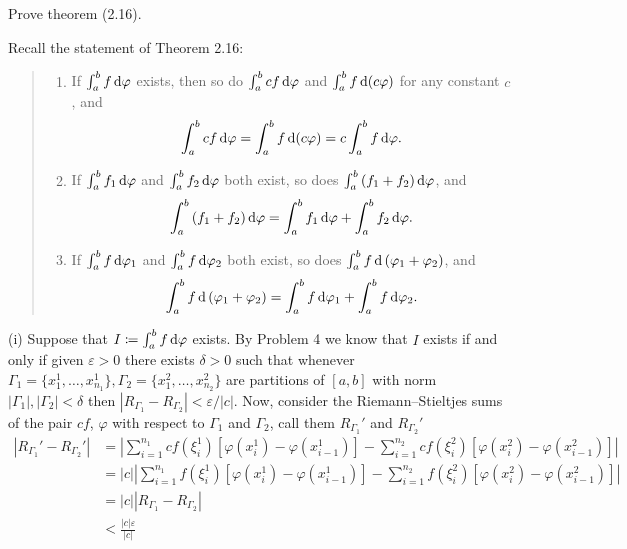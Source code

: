 \begin{problem}
  Prove theorem (2.16).
\end{problem}
\begin{solution}
  Recall the statement of Theorem 2.16:
  \begin{quote}
    \begin{enumerate}[label=(\roman*),noitemsep]
    \item If $\int_a^b f\mathop{}\!\mathrm{d}\varphi$ exists, then so do
      $\int_a^bcf\mathop{}\!\mathrm{d}\varphi$ and $\int_a^b f\mathop{}\!\mathrm{d}(c\varphi)$ for any
      constant $c$, and
      \[
        \int_a^bcf\mathop{}\!\mathrm{d}\varphi=\int_a^bf\mathop{}\!\mathrm{d}(c\varphi)=c\int_a^bf\mathop{}\!\mathrm{d}\varphi.
      \]
    \item If $\int_a^b f_1\mathop{}\!\mathrm{d}\varphi$ and $\int_a^bf_2\mathop{}\!\mathrm{d}\varphi$ both
      exist, so does $\int_a^b\left(f_1+f_2\right)\mathop{}\!\mathrm{d}\varphi$, and
      \[
        \int_a^b\left(f_1+f_2\right)\mathop{}\!\mathrm{d}\varphi=\int_a^bf_1\mathop{}\!\mathrm{d}\varphi+\int_a^bf_2\mathop{}\!\mathrm{d}\varphi.
      \]
    \item If $\int_a^bf\mathop{}\!\mathrm{d}\varphi_1$ and $\int_a^bf\mathop{}\!\mathrm{d}\varphi_2$ both
      exist, so does $\int_a^bf\mathop{}\!\mathrm{d}\left(\varphi_1+\varphi_2\right)$, and
      \[
        \int_a^bf\mathop{}\!\mathrm{d}\left(\varphi_1+\varphi_2\right)=\int_a^bf\mathop{}\!\mathrm{d}\varphi_1+\int_a^bf\mathop{}\!\mathrm{d}\varphi_2.
      \]
    \end{enumerate}
  \end{quote}
  \noindent%
  (i) Suppose that $I\coloneq\int_a^bf\mathop{}\!\mathrm{d}\varphi$ exists. By Problem 4 we
  know that $I$ exists if and only if given $\varepsilon>0$ there exists
  $\delta>0$ such that whenever
  $\Gamma_1=\{x_1^1,\ldots,x_{n_1}^1\},\Gamma_2=\{x_1^2,\ldots,x_{n_2}^2\}$
  are partitions of $[a,b]$ with norm $|\Gamma_1|,|\Gamma_2|<\delta$ then
  $|R_{\Gamma_1}-R_{\Gamma_2}|<\varepsilon/|c|$. Now, consider the
  Riemann--Stieltjes sums of the pair $cf$, $\varphi$ with respect to
  $\Gamma_1$ and $\Gamma_2$, call them $R_{\Gamma_1}'$ and $R_{\Gamma_2}'$
  \begin{align*}
    |R_{\Gamma_1}'-R_{\Gamma_2}'|
    &=\left|\sum_{i=1}^{n_1}cf(\xi_i^1)\left[\varphi(x_i^1)-\varphi(x_{i-1}^1)\right]
      -\sum_{i=1}^{n_2}cf(\xi_i^2)\left[\varphi(x_i^2)-\varphi(x_{i-1}^2)\right]\right|\\
    &=|c|\left|\sum_{i=1}^{n_1}f(\xi_i^1)\left[\varphi(x_i^1)-\varphi(x_{i-1}^1)\right]
      -\sum_{i=1}^{n_2}f(\xi_i^2)\left[\varphi(x_i^2)-\varphi(x_{i-1}^2)\right]\right|\\
    &=|c||R_{\Gamma_1}-R_{\Gamma_2}|\\
    &<\frac{|c|\varepsilon}{|c|}\\

\end{align*}
\end{solution}

